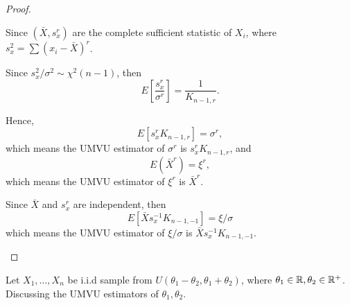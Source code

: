 \begin{proof}
\begin{enumerate}
		      Since $(\bar{X},s_x^r)$ are the complete sufficient statistic of $X_i$, where $s_x^2=\sum\left(x_{i}-\bar{X}\right)^r$.

		      Since $s_x^2/\sigma^2\sim\chi^2(n-1)$, then
		      \begin{equation*}
			      E\left[\frac{s_x^r}{\sigma^r}\right]=\frac{1}{K_{n-1,r}}.
		      \end{equation*}

		      Hence,
		      \begin{equation*}
			      E\left[s_x^rK_{n-1,r}\right]=\sigma^r,
		      \end{equation*}
		      which means the UMVU estimator of $\sigma^r$ is $s_x^rK_{n-1,r}$,
		      and
		      \begin{equation*}
			      E(\bar{X}^r)=\xi^r,
		      \end{equation*}
		      which means the UMVU estimator of $\xi^r$ is $\bar{X}^r$.

		      Since $\bar{X}$ and $s_x^r$ are independent, then
		      \begin{equation*}
			      E[\bar{X}s_x^{-1}K_{n-1,-1}]=\xi/\sigma
		      \end{equation*}
		      which means the UMVU estimator of $\xi/\sigma$ is $\bar{X}s_x^{-1}K_{n-1,-1}$.
	\end{enumerate}
\end{proof}

\begin{example}[]
	Let $X_{1},\ldots,X_{n}$ be i.i.d sample from $U\left(\theta_1-\theta_2,\theta_1+\theta_2\right)$, where $\theta_1\in{\mathbb R},\theta_2\in{\mathbb R}^+$. Discussing the UMVU estimators of $\theta_1,\theta_2$.
\end{example}

